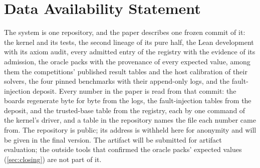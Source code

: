 
\section*{Data Availability Statement}

The system is one repository, and the paper describes one frozen
commit of it: the kernel and its tests, the second lineage of its
pure half, the Lean development with its axiom audit, every admitted
entry of the registry with the evidence of its admission, the oracle
packs with the provenance of every expected value, among them the
competitions' published result tables and the host calibration of
their solvers, the four pinned
benchmarks with their append-only logs, and the fault-injection
deposit. Every number in the paper is read from that commit: the
boards regenerate byte for byte from the logs, the fault-injection
tables from the deposit, and the trusted-base table from the
registry, each by one command of the kernel's driver, and a table in
the repository names the file each number came from. The repository
is public; its address is withheld here for anonymity and will be
given in the final version. The artifact will be submitted for artifact evaluation; the outside
tools that confirmed the oracle packs' expected values
(\cref{sec:closing}) are not part of it.
